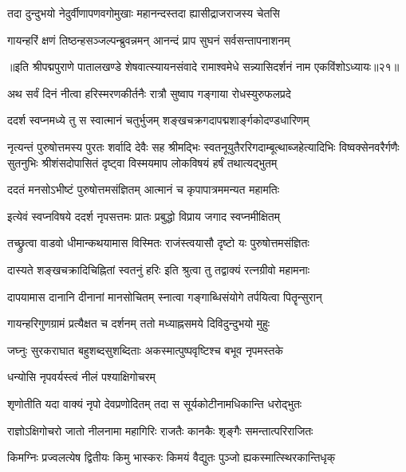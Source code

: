 \twolineshloka
{तदा दुन्दुभयो नेदुर्वीणापणवगोमुखाः}
{महानन्दस्तदा ह्यासीद्राजराजस्य चेतसि}%

\twolineshloka
{गायन्हरिं क्षणं तिष्ठन्हसञ्जल्पन्ब्रुवन्नमन्}
{आनन्दं प्राप सुघनं सर्वसन्तापनाशनम्}%

{॥इति श्रीपद्मपुराणे पातालखण्डे शेषवात्स्यायनसंवादे रामाश्वमेधे सन्न्यासिदर्शनं नाम एकविंशोऽध्यायः॥२१॥}



\twolineshloka
{अथ सर्वं दिनं नीत्वा हरिस्मरणकीर्तनैः}
{रात्रौ सुष्वाप गङ्गाया रोधस्युरुफलप्रदे}%

\twolineshloka
{ददर्श स्वप्नमध्ये तु स स्वात्मानं चतुर्भुजम्}
{शङ्खचक्रगदापद्मशार्ङ्गकोदण्डधारिणम्}%

\fourlineindentedshloka
{नृत्यन्तं पुरुषोत्तमस्य पुरतः शर्वादि देवैः सह}
{श्रीमद्भिः स्वतनूयुतैररिगदाम्बूत्थाब्जहेत्यादिभिः}
{विष्वक्सेनवरैर्गणैः सुतनुभिः श्रीशंसदोपासितं}
{दृष्ट्वा विस्मयमाप लोकविषयं हर्षं तथात्यद्भुतम्}%

\twolineshloka
{ददतं मनसोऽभीष्टं पुरुषोत्तमसंज्ञितम्}
{आत्मानं च कृपापात्रममन्यत महामतिः}%

\twolineshloka
{इत्येवं स्वप्नविषये ददर्श नृपसत्तमः}
{प्रातः प्रबुद्धो विप्राय जगाद स्वप्नमीक्षितम्}%

\twolineshloka
{तच्छ्रुत्वा वाडवो धीमान्कथयामास विस्मितः}
{राजंस्त्वयासौ दृष्टो यः पुरुषोत्तमसंज्ञितः}%

\twolineshloka
{दास्यते शङ्खचक्रादिचिह्नितां स्वतनुं हरिः}
{इति श्रुत्वा तु तद्वाक्यं रत्नग्रीवो महामनाः}%

\twolineshloka
{दापयामास दानानि दीनानां मानसोचितम्}
{स्नात्वा गङ्गाब्धिसंयोगे तर्पयित्वा पितॄन्सुरान्}%

\twolineshloka
{गायन्हरिगुणग्रामं प्रत्यैक्षत च दर्शनम्}
{ततो मध्याह्नसमये दिविदुन्दुभयो मुहुः}%

\twolineshloka
{जघ्नुः सुरकराघात बहुशब्दसुशब्दिताः}
{अकस्मात्पुष्पवृष्टिश्च बभूव नृपमस्तके}%

\onelineshloka
{धन्योसि नृपवर्यस्त्वं नीलं पश्याक्षिगोचरम्}%

\twolineshloka
{शृणोतीति यदा वाक्यं नृपो देवप्रणोदितम्}
{तदा स सूर्यकोटीनामधिकान्ति धरोद्भुतः}%

\twolineshloka
{राज्ञोऽक्षिगोचरो जातो नीलनामा महागिरिः}
{राजतैः कानकैः शृङ्गैः समन्तात्परिराजितः}%

\twolineshloka
{किमग्निः प्रज्वलत्येष द्वितीयः किमु भास्करः}
{किमयं वैद्युतः पुञ्जो ह्यकस्मात्स्थिरकान्तिधृक्}%


